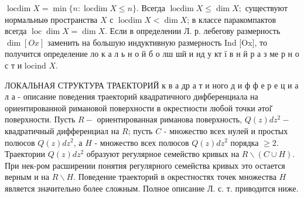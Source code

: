 \documentclass[10pt]{article}
\begin{document}
$\operatorname{locdim} X=\min \{n: \operatorname{locdim} X \leqslant n\}$. Всегда $\operatorname{locdim} X \leqslant \operatorname{dim} X ;$ существуют нормальныө пространства $X$ с $\operatorname{locdim} X<\operatorname{dim} X$; в классе паракомпактов всегда $\operatorname{loc} \operatorname{dim} X=\operatorname{dim} X$. Если в определении Л. р. лебегову размерность $\operatorname{dim}[O x]$ заменить на большую индуктивную размерность Ind [Ox], то получится определение ло к а л ь н о й б о лш шй и нд у кт ї в н й р а з ме р н о с т и locind $X$.



ЛОКАЛЬНАЯ СТРУКТУРА ТРАЕКТОРИЙ к в а др а т и ного д и ф ф е р е ц и а л а - описание поведения траекторий квадратичного дифберенциала на ориентированной римановой поверхности в окрестности любой точки әтоі̆ поверхности. Пусть $R-$ ориентированная риманова поверхность, $Q(z) d z^{2}-$ квадратичный дифференциал на $R$; пусть $C$ - множество всех нулей и простых полюсов $Q(z) d z^{2}$, а $H$ - множество всех полюсов $Q(z) d z^{2}$ порядка $\geqslant 2$. Траектории $Q(z) d z^{2}$ образуют регулярное семейство кривых на $R \backslash(C \cup H)$. При нек-ром расширении понятия регулярного семейства кривых это остается верным и на $R \backslash H$. Поведение траекторий в окрестностях точек множества $H$ является значительно более сложным. Полное описание Л. с. т. приводится ниже.
\end{document}
